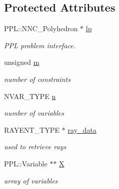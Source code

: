 \subsection*{Protected Attributes}
\begin{DoxyCompactItemize}
\item 
\mbox{\label{class_p_p_l___solver_a6abc19f36a28ed91b4ebc4d3a1e32dc6}} 
P\+P\+L\+::\+N\+N\+C\+\_\+\+Polyhedron $\ast$ \hyperlink{class_p_p_l___solver_a6abc19f36a28ed91b4ebc4d3a1e32dc6}{lp}
\begin{DoxyCompactList}\small\item\em P\+PL problem interface. \end{DoxyCompactList}\item 
\mbox{\label{class_p_p_l___solver_a6e3852b048b35faf96d8a12155b0547e}} 
unsigned \hyperlink{class_p_p_l___solver_a6e3852b048b35faf96d8a12155b0547e}{m}
\begin{DoxyCompactList}\small\item\em number of constraints \end{DoxyCompactList}\item 
\mbox{\label{class_p_p_l___solver_aa70891def9af366c47e01acf952bbdba}} 
N\+V\+A\+R\+\_\+\+T\+Y\+PE \hyperlink{class_p_p_l___solver_aa70891def9af366c47e01acf952bbdba}{n}
\begin{DoxyCompactList}\small\item\em number of variables \end{DoxyCompactList}\item 
\mbox{\label{class_p_p_l___solver_a90bb9152de9b1260cdbf938010cd48b2}} 
R\+A\+Y\+E\+N\+T\+\_\+\+T\+Y\+PE $\ast$ \hyperlink{class_p_p_l___solver_a90bb9152de9b1260cdbf938010cd48b2}{ray\+\_\+data}
\begin{DoxyCompactList}\small\item\em used to retrieve rays \end{DoxyCompactList}\item 
\mbox{\label{class_p_p_l___solver_a157a18ab31b415a615bca9845248bfcc}} 
P\+P\+L\+::\+Variable $\ast$$\ast$ \hyperlink{class_p_p_l___solver_a157a18ab31b415a615bca9845248bfcc}{X}
\begin{DoxyCompactList}\small\item\em array of variables \end{DoxyCompactList}\end{DoxyCompactItemize}

